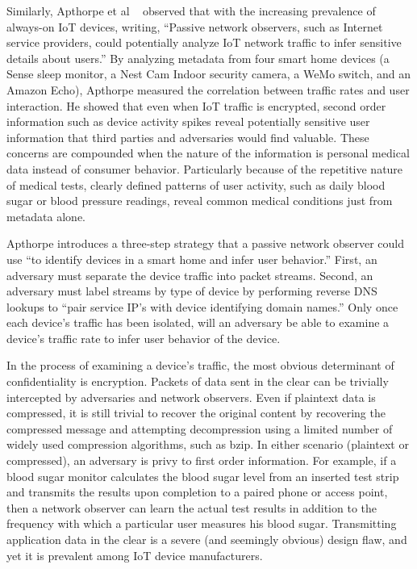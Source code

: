 Similarly, Apthorpe et al ~\cite{apthorpeIoT} observed that with the increasing prevalence of always-on IoT devices, writing, ``Passive network observers, such as Internet service providers, could potentially analyze IoT network traffic to infer sensitive details about users.'' By analyzing metadata from four smart home devices (a Sense sleep monitor, a Nest Cam Indoor security camera, a WeMo switch, and an Amazon Echo), Apthorpe measured the correlation between traffic rates and user interaction. He showed that even when IoT traffic is encrypted, second order information such as device activity spikes reveal potentially sensitive user information that third parties and adversaries would find valuable. These concerns are compounded when the nature of the information is personal medical data instead of consumer behavior. Particularly because of the repetitive nature of medical tests, clearly defined patterns of user activity, such as daily blood sugar or blood pressure readings, reveal common medical conditions just from metadata alone. 

Apthorpe introduces a three-step strategy that a passive network observer could use ``to identify devices in a smart home and infer user behavior.'' First, an adversary must separate the device traffic into packet streams. Second, an adversary must label streams by type of device by performing reverse DNS lookups to ``pair service IP's with device identifying domain names.'' Only once each device's traffic has been isolated, will an adversary be able to examine a device's traffic rate to infer user behavior of the device. 

In the process of examining a device's traffic, the most obvious determinant of confidentiality is encryption. Packets of data sent in the clear can be trivially intercepted by adversaries and network observers. Even if plaintext data is compressed, it is still trivial to recover the original content by recovering the compressed message and attempting decompression using a limited number of widely used compression algorithms, such as bzip. In either scenario (plaintext or compressed), an adversary is privy to first order information. For example, if a blood sugar monitor calculates the blood sugar level from an inserted test strip and transmits the results upon completion to a paired phone or access point, then a network observer can learn the actual test results in addition to the frequency with which a particular user measures his blood sugar. Transmitting application data in the clear is a severe (and seemingly obvious) design flaw, and yet it is prevalent among IoT device manufacturers. 

